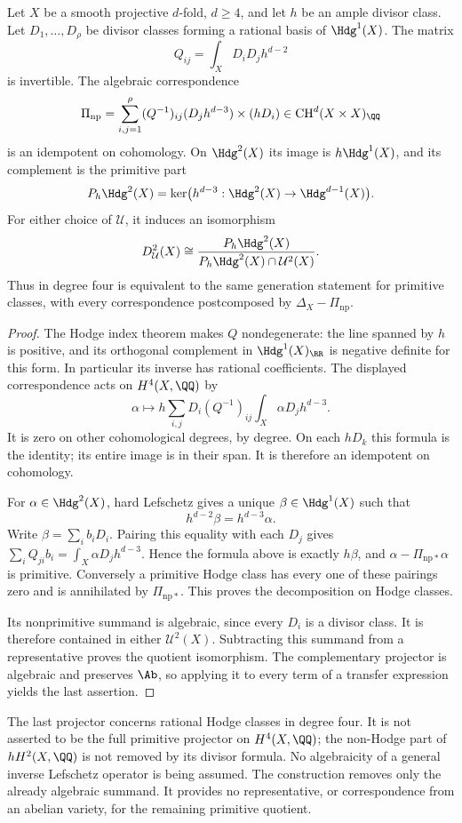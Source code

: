 \begin{proposition}
\label{v7:prop:primitive-hodge-projector}
Let \(X\) be a smooth projective \(d\)-fold, \(d\ge4\), and
let \(h\) be an ample divisor class. Let \(D_1,\ldots,D_\rho\)
be divisor classes forming a rational basis of \(\Hdg^1(X)\).
The matrix
\[
 Q_{ij}=\int_X D_iD_jh^{d-2}
\]
is invertible. The algebraic correspondence
\[
 \Pi_{\mathrm{np}}=
  \sum_{i,j=1}^{\rho}(Q^{-1})_{ij}
          (D_jh^{d-3})\times(hD_i)
       \in\operatorname{CH}^{d}(X\times X)_{\QQ}
\]
is an idempotent on cohomology. On \(\Hdg^2(X)\) its image is
\(h\Hdg^1(X)\), and its complement is the primitive part
\[
 P_h\Hdg^2(X)=
  \ker\bigl(h^{d-3}:\Hdg^2(X)\to\Hdg^{d-1}(X)\bigr).
\]
For either choice of \(\mathcal U\), it induces an isomorphism
\[
 D_{\mathcal U}^2(X)
    \cong
 \frac{P_h\Hdg^2(X)}
      {P_h\Hdg^2(X)\cap\mathcal U^2(X)}.
\]
Thus \Fiii{} in degree four is equivalent to the same
generation statement for primitive classes, with every
correspondence postcomposed by
\(\Delta_X-\Pi_{\mathrm{np}}\).
\end{proposition}

\begin{proof}
The Hodge index theorem makes \(Q\) nondegenerate: the line
spanned by \(h\) is positive, and its orthogonal complement
in \(\Hdg^1(X)_{\RR}\) is negative definite for this form.
In particular its inverse has rational coefficients. The
displayed correspondence acts on \(H^4(X,\QQ)\) by
\[
 \alpha\longmapsto
   h\sum_{i,j}D_i(Q^{-1})_{ij}
           \int_X\alpha D_jh^{d-3}.
\]
It is zero on other cohomological degrees, by degree. On each
\(hD_k\) this formula is the identity; its entire image is
in their span. It is therefore an idempotent on cohomology.

For \(\alpha\in\Hdg^2(X)\), hard Lefschetz gives a unique
\(\beta\in\Hdg^1(X)\) such that
\[
 h^{d-2}\beta=h^{d-3}\alpha.
\]
Write \(\beta=\sum_i b_iD_i\). Pairing this equality with
each \(D_j\) gives \(\sum_iQ_{ji}b_i
=\int_X\alpha D_jh^{d-3}\). Hence the formula above is
exactly \(h\beta\), and \(\alpha-\Pi_{\mathrm{np}*}\alpha\)
is primitive. Conversely a primitive Hodge class has every
one of these pairings zero and is annihilated by
\(\Pi_{\mathrm{np}*}\). This proves the decomposition on
Hodge classes.

Its nonprimitive summand is algebraic, since every \(D_i\)
is a divisor class. It is therefore contained in either
\(\mathcal U^2(X)\). Subtracting this summand from a
representative proves the quotient isomorphism. The
complementary projector is algebraic and preserves \(\Ab\),
so applying it to every term of a transfer expression yields
the last assertion.
\end{proof}

The last projector concerns rational Hodge classes in degree
four. It is not asserted to be the full primitive projector on
\(H^4(X,\QQ)\); the non-Hodge part of \(hH^2(X,\QQ)\) is
not removed by its divisor formula. No algebraicity of a
general inverse Lefschetz operator is being assumed. The
construction removes only the already algebraic summand.
It provides no representative, or correspondence from an
abelian variety, for the remaining primitive quotient.
